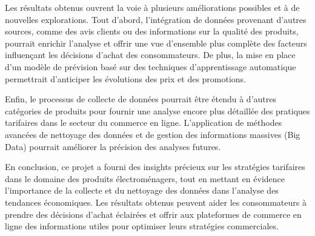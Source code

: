 \documentclass[a4paper, 12pt, oneside]{report}
\begin{document}
Les résultats obtenus ouvrent la voie à plusieurs améliorations possibles et à de nouvelles explorations. Tout d'abord, l'intégration de données provenant d'autres sources, comme des avis clients ou des informations sur la qualité des produits, pourrait enrichir l'analyse et offrir une vue d'ensemble plus complète des facteurs influençant les décisions d'achat des consommateurs. De plus, la mise en place d'un modèle de prévision basé sur des techniques d'apprentissage automatique permettrait d'anticiper les évolutions des prix et des promotions.

Enfin, le processus de collecte de données pourrait être étendu à d'autres catégories de produits pour fournir une analyse encore plus détaillée des pratiques tarifaires dans le secteur du commerce en ligne. L'application de méthodes avancées de nettoyage des données et de gestion des informations massives (Big Data) pourrait améliorer la précision des analyses futures.

En conclusion, ce projet a fourni des insights précieux sur les stratégies tarifaires dans le domaine des produits électroménagers, tout en mettant en évidence l'importance de la collecte et du nettoyage des données dans l’analyse des tendances économiques. Les résultats obtenus peuvent aider les consommateurs à prendre des décisions d'achat éclairées et offrir aux plateformes de commerce en ligne des informations utiles pour optimiser leurs stratégies commerciales.

\newpage
{}
{}
%

\end{document}
